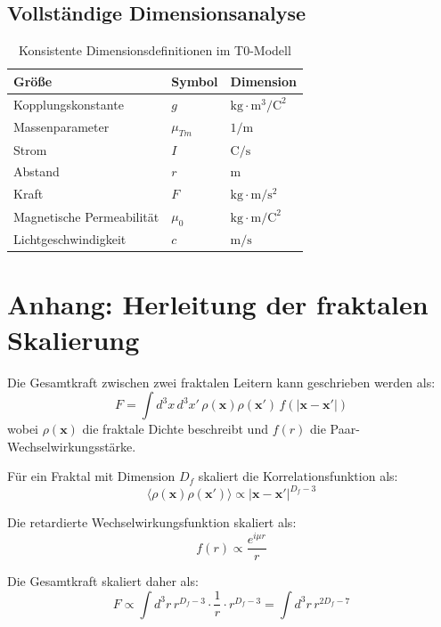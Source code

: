 	\subsection{Vollständige Dimensionsanalyse}
	\begin{table}[h]
		\centering
		\begin{tabular}{lll}
			\hline
			Größe & Symbol & Dimension \\
			\hline
			Kopplungskonstante & $g$ & $\text{kg} \cdot \text{m}^3/\text{C}^2$ \\
			Massenparameter & $\mu_{Tm}$ & $1/\text{m}$ \\
			Strom & $I$ & $\text{C}/\text{s}$ \\
			Abstand & $r$ & $\text{m}$ \\
			Kraft & $F$ & $\text{kg} \cdot \text{m}/\text{s}^2$ \\
			Magnetische Permeabilität & $\mu_0$ & $\text{kg} \cdot \text{m}/\text{C}^2$ \\
			Lichtgeschwindigkeit & $c$ & $\text{m}/\text{s}$ \\
			\hline
		\end{tabular}
		\caption{Konsistente Dimensionsdefinitionen im T0-Modell}
		\label{tab:dimensions}
	\end{table}
	
	\section*{Anhang: Herleitung der fraktalen Skalierung}
	Die Gesamtkraft zwischen zwei fraktalen Leitern kann geschrieben werden als:
	\begin{equation}
		F = \int d^3x \, d^3x' \, \rho(\mathbf{x}) \rho(\mathbf{x}') \, f(|\mathbf{x}-\mathbf{x}'|)
	\end{equation}
	wobei $\rho(\mathbf{x})$ die fraktale Dichte beschreibt und $f(r)$ die Paar-Wechselwirkungsstärke.
	
	Für ein Fraktal mit Dimension $D_f$ skaliert die Korrelationsfunktion als:
	\begin{equation}
		\langle \rho(\mathbf{x}) \rho(\mathbf{x}')\rangle \propto |\mathbf{x}-\mathbf{x}'|^{D_f - 3}
	\end{equation}
	
	Die retardierte Wechselwirkungsfunktion skaliert als:
	\begin{equation}
		f(r) \propto \frac{e^{i\mu r}}{r}
	\end{equation}
	
	Die Gesamtkraft skaliert daher als:
	\begin{equation}
		F \propto \int d^3r \, r^{D_f - 3} \cdot \frac{1}{r} \cdot r^{D_f - 3} = \int d^3r \, r^{2D_f - 7}
	\end{equation}
	
